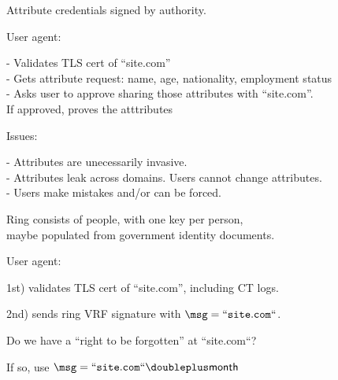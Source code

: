 \documentclass{beamer}
\begin{document}
\begin{frame} %

Attribute credentials signed by authority.

\bigskip\smallskip

User agent: \\ \smallskip

- Validates TLS cert of ``site.com'' \\ \smallskip
- Gets attribute request: name, age, nationality, employment status \\ \smallskip
{}
- Asks user to approve sharing those attributes with ``site.com''. \\
\hspace{10pt} If approved, proves the atttributes

\bigskip\smallskip

Issues: \\ \smallskip

- Attributes are unecessarily invasive. \\ \smallskip
- Attributes leak across domains.  Users cannot change attributes. \\ \smallskip
- Users make mistakes and/or can be forced. \\ \medskip
\hspace{30pt}  

\end{frame}



\begin{frame} %

Ring consists of people, with one key per person, \\ 
\hspace{10pt} maybe populated from government identity documents.

\bigskip\smallskip

User agent: \\ \smallskip

1st) validates TLS cert of ``site.com'', including CT logs. \\ \smallskip

2nd) sends ring VRF signature with $\msg = \mathtt{``site.com``}$. \\ \smallskip

\pause\bigskip\bigskip 

Do we have a ``right to be forgotten'' at ``site.com``? \\ \smallskip

\hspace{10pt} If so, use $\msg = \mathtt{``site.com``} \doubleplus \mathsf{month}$

\end{frame}
\end{document}

